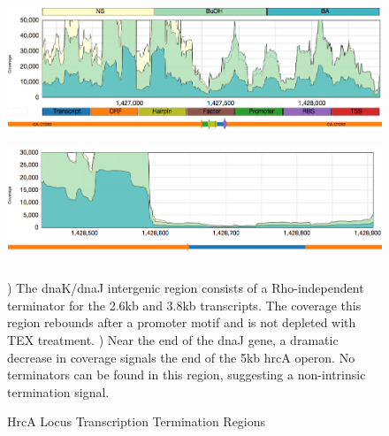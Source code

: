 \begin{figure}
\small
{\includegraphics[width=\textwidth,height=1.5in]{images/Assembly/Examples/HrcA/DnaKJ-IGR.png}
\label{fig:5.17a}}
{\includegraphics[width=\textwidth,height=1.5in]{images/Assembly/Examples/HrcA/HrcA-termination.png}
\label{fig:5.17b}}
\caption{HrcA Locus Transcription Termination Regions}
) The dnaK/dnaJ intergenic region consists of a Rho-independent terminator for the 2.6kb and 3.8kb transcripts. The coverage this region rebounds after a promoter motif and is not depleted with TEX treatment. ) Near the end of the dnaJ gene, a dramatic decrease in coverage signals the end of the 5kb hrcA operon. No terminators can be found in this region, suggesting a non-intrinsic termination signal.
\end{figure}


